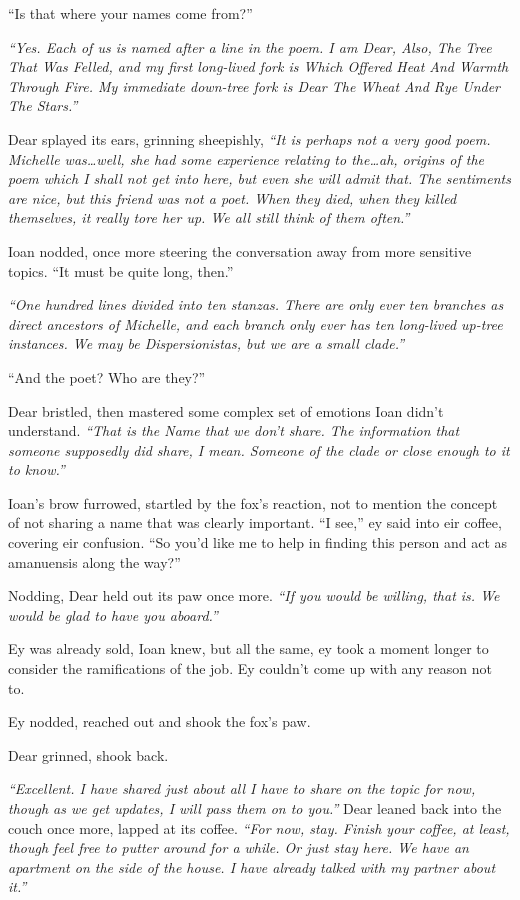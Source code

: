 ``Is that where your names come from?''

\emph{``Yes. Each of us is named after a line in the poem. I am Dear, Also, The Tree That Was Felled, and my first long-lived fork is Which Offered Heat And Warmth Through Fire. My immediate down-tree fork is Dear The Wheat And Rye Under The Stars.''}

Dear splayed its ears, grinning sheepishly, \emph{``It is perhaps not a very good poem. Michelle was\ldots{}well, she had some experience relating to the\ldots{}ah, origins of the poem which I shall not get into here, but even she will admit that. The sentiments are nice, but this friend was not a poet. When they died, when they killed themselves, it really tore her up. We all still think of them often.''}

Ioan nodded, once more steering the conversation away from more sensitive topics. ``It must be quite long, then.''

\emph{``One hundred lines divided into ten stanzas. There are only ever ten branches as direct ancestors of Michelle, and each branch only ever has ten long-lived up-tree instances. We may be Dispersionistas, but we are a small clade.''}

``And the poet? Who are they?''

Dear bristled, then mastered some complex set of emotions Ioan didn't understand. \emph{``That is the Name that we don't share. The information that someone supposedly did share, I mean. Someone of the clade or close enough to it to know.''}

Ioan's brow furrowed, startled by the fox's reaction, not to mention the concept of not sharing a name that was clearly important. ``I see,'' ey said into eir coffee, covering eir confusion. ``So you'd like me to help in finding this person and act as amanuensis along the way?''

Nodding, Dear held out its paw once more. \emph{``If you would be willing, that is. We would be glad to have you aboard.''}

Ey was already sold, Ioan knew, but all the same, ey took a moment longer to consider the ramifications of the job. Ey couldn't come up with any reason not to.

Ey nodded, reached out and shook the fox's paw.

Dear grinned, shook back.

\emph{``Excellent. I have shared just about all I have to share on the topic for now, though as we get updates, I will pass them on to you.''} Dear leaned back into the couch once more, lapped at its coffee. \emph{``For now, stay. Finish your coffee, at least, though feel free to putter around for a while. Or just stay here. We have an apartment on the side of the house. I have already talked with my partner about it.''}

